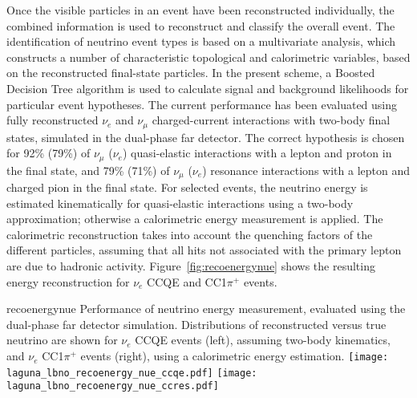 Once the visible particles in an event have been reconstructed
individually, the combined information is used to reconstruct and
classify the overall event.  The identification of neutrino event
types is based on a multivariate
analysis\cite{Back:2013cva,WA105_TDR,LAGUNA-LBNO-deliv,LAGUNA-LBNO-EOI},
which constructs a number of characteristic topological and
calorimetric variables, based on the reconstructed final-state
particles. In the present scheme, a Boosted Decision Tree algorithm is
used to calculate signal and background likelihoods for particular
event hypotheses. The current performance has been evaluated using
fully reconstructed $\nu_{e}$ and $\nu_{\mu}$ charged-current
interactions with two-body final states, simulated in the dual-phase
far detector\cite{LAGUNA-LBNO-deliv}.  The correct hypothesis is
chosen for 92\% (79\%) of $\nu_{\mu}$ ($\nu_{e}$) quasi-elastic
interactions with a lepton and proton  in the final state, and 79\%
(71\%) of $\nu_{\mu}$ ($\nu_{e}$) resonance interactions with a lepton
and charged pion in the final state.  For selected events, the
neutrino energy is estimated kinematically for quasi-elastic
interactions using a two-body approximation; otherwise a
calorimetric energy measurement is applied.  The calorimetric
reconstruction takes into account the quenching factors of the
different particles, assuming that all hits not associated with the
primary lepton are due to hadronic activity.
Figure~\ref{fig:recoenergynue} shows the resulting energy
reconstruction for $\nu_e$ CCQE and CC1$\pi^{+}$ events.
\begin{cdrfigure}{recoenergynue}
{Performance of neutrino energy measurement, evaluated using the dual-phase far detector simulation. 
Distributions of reconstructed versus true neutrino are shown for $\nu_{e}$ CCQE events (left),
assuming two-body kinematics, and $\nu_{e}$  CC1$\pi^{+}$ events (right),
using a calorimetric energy estimation.}
\texttt{[image: laguna\_lbno\_recoenergy\_nue\_ccqe.pdf]}
\texttt{[image: laguna\_lbno\_recoenergy\_nue\_ccres.pdf]}
\end{cdrfigure}

